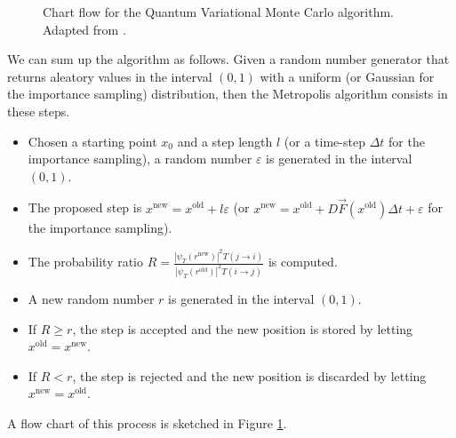 \begin{figure}[h]
\begin{tikzpicture}[node distance=2cm]
	\end{tikzpicture}
	\caption{Chart flow for the Quantum Variational Monte Carlo algorithm. Adapted from \cite{Hjorth-Jensen2014}.}
	\label{fig:chart_flow}
\end{figure}

We can sum up the algorithm as follows. Given a random number generator that returns aleatory values in the interval $(0, 1)$ with a uniform (or Gaussian for the importance sampling) distribution, then the Metropolis algorithm consists in these steps.
\begin{itemize}
	\item Chosen a starting point $x_0$ and a step length $l$ (or a time-step $\Delta t$ for the importance sampling), a random number $\varepsilon$ is generated in the interval $(0, 1)$.
	\item The proposed step is $x^{\text{new}}=x^{\text{old}} + l\varepsilon$ (or $x^{\text{new}} = x^{\text{old}} + D\vec{F}(x^{\text{old}})\Delta t + \varepsilon$ for the importance sampling).
	\item The probability ratio $R = \frac{|\psi_T(r^{\text{new}})|^2T(j \rightarrow i)}{|\psi_T(r^{\text{old}})|^2T(i \rightarrow j)}$ is computed.
	\item A new random number $r$ is generated in the interval $(0, 1)$.
	\item If $R \geq r$, the step is accepted and the new position is stored by letting $x^{\text{old}}=x^{\text{new}}$.
	\item If $R < r$, the step is rejected and the new position is discarded by letting $x^{\text{new}}=x^{\text{old}}$.
\end{itemize}
A flow chart of this process is sketched in Figure \ref{fig:chart_flow}.